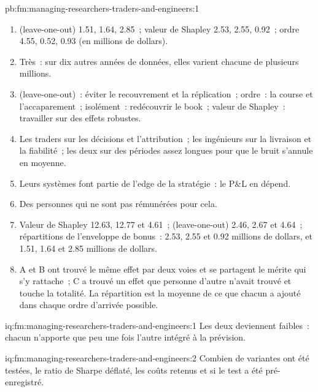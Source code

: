 \begin{solution}{pb:fm:managing-researchers-traders-and-engineers:1}
\begin{enumerate}
\item {} (leave-one-out) 1.51, 1.64, 2.85~; valeur de Shapley 2.53, 2.55, 0.92~; ordre 4.55, 0.52, 0.93 (en millions de dollars).
\item Très~: sur dix autres années de données, elles varient chacune de plusieurs millions.
\item {} (leave-one-out)~: éviter le recouvrement et la réplication~; ordre~: la course et l'accaparement~; isolément~: redécouvrir le book~; valeur de Shapley~: travailler sur des effets robustes.
\item Les traders sur les décisions et l'attribution~; les ingénieurs sur la livraison et la fiabilité~; les deux sur des périodes assez longues pour que le bruit s'annule en moyenne.
\item Leurs systèmes font partie de l'edge de la stratégie~: le P\&L en dépend.
\item Des personnes qui ne sont pas rémunérées pour cela.
\item Valeur de Shapley 12.63, 12.77 et 4.61~;  (leave-one-out) 2.46, 2.67 et 4.64~; répartitions de l'enveloppe de bonus~: 2.53, 2.55 et 0.92 millions de dollars, et 1.51, 1.64 et 2.85 millions de dollars.
\item A et B ont trouvé le même effet par deux voies et se partagent le mérite qui s'y rattache~; C a trouvé un effet que personne d'autre n'avait trouvé et touche la totalité. La répartition
est la moyenne de ce que chacun a ajouté dans chaque ordre d'arrivée possible.
\end{enumerate}
\end{solution}

\begin{solution}{iq:fm:managing-researchers-traders-and-engineers:1}
Les deux deviennent faibles~: chacun n'apporte que peu une fois l'autre intégré à la prévision.
\end{solution}

\begin{solution}{iq:fm:managing-researchers-traders-and-engineers:2}
Combien de variantes ont été testées, le ratio de Sharpe déflaté, les coûts retenus et si le test a été pré-enregistré.
\end{solution}

